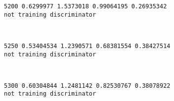 \documentclass[11pt]{article}
\begin{document}
    \begin{Verbatim}[commandchars=\\\{\}]
5200 0.6299977 1.5373018 0.99064195 0.26935342
not training discriminator

    \end{Verbatim}

    \begin{center}
    \end{center}
    { \hspace*{\fill} \\}
    
    \begin{Verbatim}[commandchars=\\\{\}]
5250 0.53404534 1.2390571 0.68381554 0.38427514
not training discriminator

    \end{Verbatim}

    \begin{center}
    \end{center}
    { \hspace*{\fill} \\}
    
    \begin{Verbatim}[commandchars=\\\{\}]
5300 0.60304844 1.2481142 0.82530767 0.38078922
not training discriminator

    \end{Verbatim}

    \begin{center}
    \end{center}
    { \hspace*{\fill} \\}
    
\end{document}
